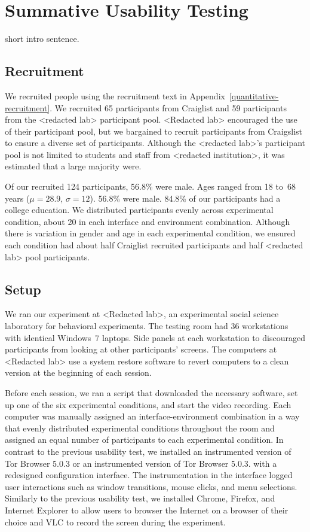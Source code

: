\documentclass[USenglish,oneside,twocolumn]{article}
\begin{document}
\section{Summative Usability Testing}
\label{sec:quantitative}

{\color {blue} 
short intro sentence.
}

\subsection{Recruitment}
We recruited  people using the recruitment text in Appendix~\ref{quantitative-recruitment}. We recruited 65 participants from Craiglist and 59 participants from the <redacted lab> participant pool. <Redacted lab> encouraged the use of their participant pool, but we bargained to recruit participants from Craigslist to ensure a diverse set of participants. Although the <redacted lab>'s participant pool is not limited to students and staff from <redacted institution>, it was estimated that a large majority were. 

Of our recruited 124 participants, 56.8\% were male. Ages ranged from 18 to~68 years ($\mu = 28.9$, $\sigma = 12$). 56.8\% were male. 84.8\% of our participants had a college education. We distributed participants evenly across experimental condition, about 20 in each interface and environment combination. Although there is variation in gender and age in each experimental condition, we ensured each condition had about half Craiglist recruited participants and half <redacted lab>  pool participants. 

\subsection{Setup}
We ran our experiment at <Redacted lab>, an experimental social science laboratory for behavioral experiments. The testing room had 36 workstations with identical Windows~7 laptops. Side panels at each workstation to discouraged participants from looking at other participants' screens. 
The computers at <Redacted lab> use a system restore software to revert computers to a clean version at the beginning of each session. 

Before each session, we ran a script that downloaded the necessary software, set up one of the six experimental conditions, and start the video recording. Each computer was manually assigned an interface-environment combination in a way that evenly distributed experimental conditions throughout the room and assigned an equal number of participants to each experimental condition. In contrast to the previous usability test, we installed an instrumented version of Tor Browser 5.0.3 or an instrumented version of Tor Browser 5.0.3. with a redesigned configuration interface. The instrumentation in the interface logged user interactions such as window transitions, mouse clicks, and menu selections. Similarly to the previous usability test, we installed Chrome, Firefox, and Internet Explorer to allow users to browser the Internet on a browser of their choice and VLC to record the screen during the experiment.
\end{document}
